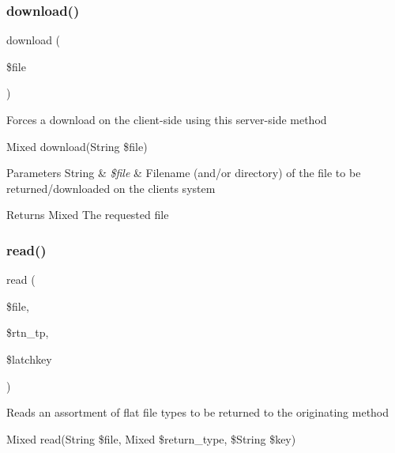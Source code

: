 \subsubsection{\texorpdfstring{download()}{download()}}
{\footnotesize\ttfamily download (\begin{DoxyParamCaption}\item[{}]{\$file }\end{DoxyParamCaption})}

Forces a download on the client-\/side using this server-\/side method

Mixed download(String \$file)


\begin{DoxyParams}[1]{Parameters}
String & {\em \$file} & Filename (and/or directory) of the file to be returned/downloaded on the client\textquotesingle{}s system \\
\hline
\end{DoxyParams}
\begin{DoxyReturn}{Returns}
Mixed The requested file 
\end{DoxyReturn}
\mbox{\label{class_w_a_f_f_l_e_1_1_framework_1_1_i_o_1_1_file_abe1b4778c16b961777ab1aa25474995d}} 
\subsubsection{\texorpdfstring{read()}{read()}}
{\footnotesize\ttfamily read (\begin{DoxyParamCaption}\item[{}]{\$file,  }\item[{}]{\$rtn\+\_\+tp,  }\item[{}]{\$latchkey }\end{DoxyParamCaption})}

Reads an assortment of flat file types to be returned to the originating method

Mixed read(String \$file, Mixed \$return\+\_\+type, \$\+String \$key)


